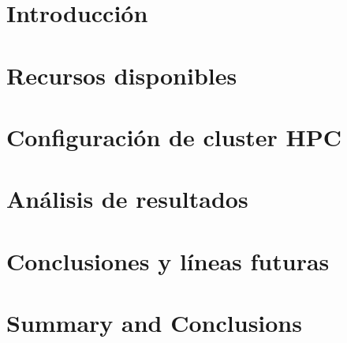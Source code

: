 \documentclass[spanish,a4paper,12pt,oneside]{extreport}
\begin{document}
\renewcommand{\thepage}{\arabic{page}}
\setcounter{page}{1}
\pagestyle{plain}

\chapter{\LARGE Introducción}
\label{chapter:intro}



\newpage{\pagestyle{empty}}
\thispagestyle{empty}

\chapter{\LARGE Recursos disponibles}
\label{chapter:dos}



\newpage{\pagestyle{empty}}
\thispagestyle{empty}

\chapter{\LARGE Configuración de cluster HPC}
\label{chapter:tres}



\newpage{\pagestyle{empty}}
\thispagestyle{empty}

\chapter{\LARGE Análisis de resultados}
\label{chapter:cuatro}



\newpage{\pagestyle{empty}}
\thispagestyle{empty}

\chapter{\LARGE Conclusiones y líneas futuras}
\label{chapter:Resultados}



\newpage{\pagestyle{empty}}
\thispagestyle{empty}

\chapter{\LARGE Summary and Conclusions}
\label{chapter:Conclusiones}
\end{document}
